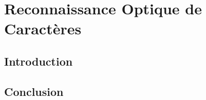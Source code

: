 \chapter{\textbf{Reconnaissance Optique de Caractères}}
    \section{Introduction}

    \section{Conclusion}